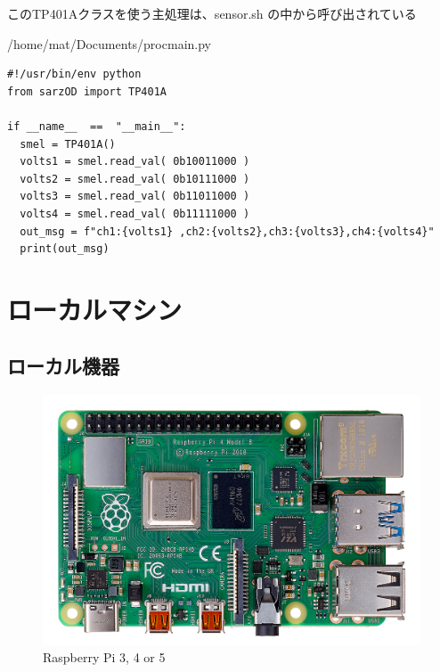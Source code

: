\documentclass[12pt,a4paper,uplatex]{jsarticle}
\begin{document}
このTP401Aクラスを使う主処理は、sensor.sh の中から呼び出されている

\begin{itembox}[l]{/home/mat/Documents/procmain.py}
	\begin{verbatim}
#!/usr/bin/env python
from sarzOD import TP401A

if __name__  ==  "__main__":
  smel = TP401A()
  volts1 = smel.read_val( 0b10011000 ) 
  volts2 = smel.read_val( 0b10111000 ) 
  volts3 = smel.read_val( 0b11011000 ) 
  volts4 = smel.read_val( 0b11111000 )
  out_msg = f"ch1:{volts1} ,ch2:{volts2},ch3:{volts3},ch4:{volts4}" 
  print(out_msg)
	\end{verbatim}
\end{itembox}

\section{ローカルマシン}

\subsection{ローカル機器}

\begin{figure}[H]
	\begin{minipage}[b]{1.0\linewidth}
		\centering
		\includegraphics[keepaspectratio, scale=0.12]{figs/jpg/udrp4b_front.jpg}
		\caption{Raspberry Pi 3, 4 or 5}
	\end{minipage}
\end{figure}
\end{document}
